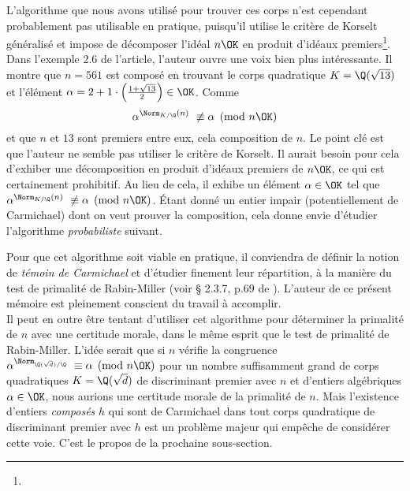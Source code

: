 L'algorithme que nous avons utilisé pour trouver ces corps n'est cependant probablement pas utilisable en pratique, puisqu'il utilise le critère de Korselt généralisé et impose de décomposer l'idéal $n\OK$ en produit d'idéaux premiers\footnote{}. Dans l'exemple 2.6 de l'article, l'auteur ouvre une voix bien plus intéressante. Il montre que $n = 561$ est composé en trouvant le corps quadratique $K = \Q(\sqrt{13})$ et l'élément $\alpha = 2 + 1\cdot \left(\frac{1 + \sqrt{13}}{2}\right) \in \OK$. Comme $$\alpha^{\Norm_{K/\Q}(n)} \not \equiv \alpha \pmod{n\OK}$$ et que $n$ et $13$ sont premiers entre eux, cela composition de $n$. Le point clé est que l'auteur ne semble pas utiliser le critère de Korselt. Il aurait besoin pour cela d'exhiber une décomposition en produit d'idéaux premiers de $n\OK$, ce qui est certainement prohibitif. Au lieu de cela, il exhibe un élément $\alpha\in \OK$ tel que $\alpha^{\Norm_{K/\Q}(n)} \not \equiv \alpha \pmod{n\OK}$. Étant donné un entier impair (potentiellement de Carmichael) dont on veut prouver la composition, cela donne envie d'étudier l'algorithme \emph{probabiliste} suivant.

\vspace{1em}
\begin{algorithm}[H]
\end{algorithm}
\vspace{1em}

Pour que cet algorithme soit viable en pratique, il conviendra de définir la notion de \textit{témoin de Carmichael} et d'étudier finement leur répartition, à la manière du test de primalité de Rabin-Miller (voir § 2.3.7, p.69 de \cite{Demazure}). L'auteur de ce présent mémoire est pleinement conscient du travail à accomplir. \\

Il peut en outre être tentant d'utiliser cet algorithme pour déterminer la primalité de $n$ avec une certitude morale, dans le même esprit que le test de primalité de Rabin-Miller. L'idée serait que si $n$ vérifie la congruence $\alpha^{\Norm_{\Q(\sqrt{d})/\Q}} \equiv \alpha \pmod{n\OK}$ pour un nombre suffisamment grand de corps quadratiques $K = \Q(\sqrt{d})$ de discriminant premier avec $n$ et d'entiers algébriques $\alpha \in \OK$, nous aurions une certitude morale de la primalité de $n$. Mais l'existence d'entiers \emph{composés} $h$ qui sont de Carmichael dans tout corps quadratique de discriminant premier avec $h$ est un problème majeur qui empêche de considérer cette voie. C'est le propos de la prochaine sous-section.



